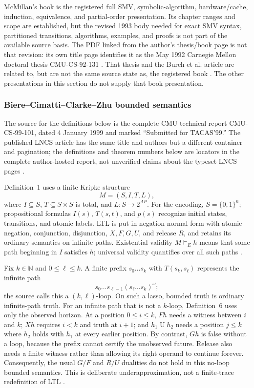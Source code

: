 McMillan's book is the registered full SMV, symbolic-algorithm, hardware/cache,
induction, equivalence, and partial-order presentation. Its chapter ranges and
scope are established, but the revised 1993 body needed for exact SMV syntax,
partitioned transitions, algorithms, examples, and proofs is not part of the
available source basis. The PDF linked from the author's thesis/book page is
not that revision: its own title page identifies it as the May 1992 Carnegie
Mellon doctoral thesis CMU-CS-92-131 \cite{McMillan1992Thesis}. That thesis and
the Burch et al. article are related to, but are not the same source state as,
the registered book \cite{McMillan1993}. The other presentations in this
section do not supply that book presentation.

\subsubsection{Biere--Cimatti--Clarke--Zhu bounded semantics}
\label{sec:p09-n-c-017-biere}

The source for the definitions below is the complete CMU technical report
CMU-CS-99-101, dated 4 January 1999 and marked ``Submitted for TACAS'99.''  The
published LNCS article has the same title and authors but a different container
and pagination; the definitions and theorem numbers below are locators in the
complete author-hosted report, not unverified claims about the typeset LNCS
pages \cite{BiereCimattiClarkeZhu1999}.

Definition~1 uses a finite Kripke structure
\[
 M=(S,I,T,L),
\]
where \(I\subseteq S\), \(T\subseteq S\times S\) is total, and
\(L:S\to2^{AP}\).  For the encoding, \(S=\{0,1\}^n\); propositional formulas
\(I(s)\), \(T(s,t)\), and \(p(s)\) recognize initial states, transitions, and
atomic labels.  LTL is put in negation normal form with atomic negation,
conjunction, disjunction, \(X,F,G,U\), and release \(R\), and retains its
ordinary semantics on infinite paths.  Existential validity
\(M\models_E h\) means that some path beginning in \(I\) satisfies \(h\);
universal validity quantifies over all such paths
\cite[defs.~1--3]{BiereCimattiClarkeZhu1999}.

Fix \(k\in\mathbb N\) and \(0\leq\ell\leq k\). A finite prefix
\(s_0\ldots s_k\) with
\(T(s_k,s_\ell)\) represents the infinite path
\[
 s_0\ldots s_{\ell-1}(s_\ell\ldots s_k)^\omega;
\]
the source calls this a \((k,\ell)\)-loop.  On such a lasso, bounded truth is
ordinary infinite-path truth. For an infinite path that is not a \(k\)-loop,
Definition~6 uses only the observed horizon. At a position \(0\leq i\leq k\),
\(Fh\) needs a witness
between \(i\) and \(k\); \(Xh\) requires \(i<k\) and truth at \(i+1\); and
\(h_1\mathbin{U}h_2\) needs a position \(j\leq k\) where \(h_2\) holds with
\(h_1\) at every earlier position.  By contrast, \(Gh\) is false without a
loop, because the prefix cannot certify the unobserved future.  Release also
needs a finite witness rather than allowing its right operand to continue
forever.  Consequently, the usual \(G/F\) and \(R/U\) dualities do not hold in
this no-loop bounded semantics.  This is deliberate underapproximation, not a
finite-trace redefinition of LTL
\cite[defs.~4--6]{BiereCimattiClarkeZhu1999}.

